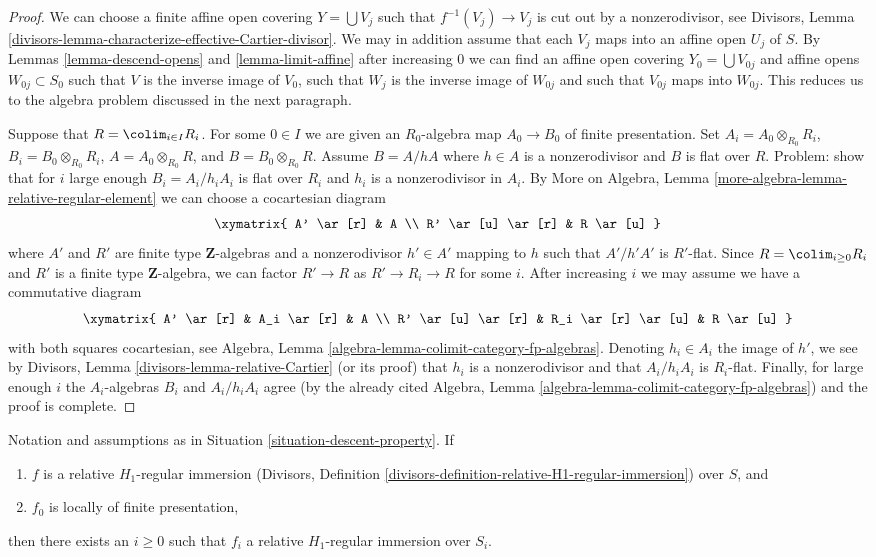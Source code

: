 \begin{proof}
We can choose a finite affine open covering $Y = \bigcup V_j$
such that $f^{-1}(V_j) \to V_j$ is cut out by a nonzerodivisor, see
Divisors, Lemma \ref{divisors-lemma-characterize-effective-Cartier-divisor}.
We may in addition assume that each $V_j$ maps into an affine open
$U_j$ of $S$.
By Lemmas \ref{lemma-descend-opens} and \ref{lemma-limit-affine}
after increasing $0$ we can find an affine open covering
$Y_0 = \bigcup V_{0j}$ and affine opens $W_{0j} \subset S_0$
such that $V$ is the inverse image of $V_0$, such that $W_j$ is the
inverse image of $W_{0j}$ and such that $V_{0j}$ maps into $W_{0j}$.
This reduces us to the algebra problem discussed in the next
paragraph.

\medskip\noindent
Suppose that $R = \colim_{i \in I} R_i$. For some $0 \in I$ we are given
an $R_0$-algebra map $A_0 \to B_0$ of finite presentation. Set
$A_i = A_0 \otimes_{R_0} R_i$, $B_i = B_0 \otimes_{R_0} R_i$,
$A = A_0 \otimes_{R_0} R$, and $B = B_0 \otimes_{R_0} R$.
Assume $B = A/hA$ where $h \in A$ is a nonzerodivisor and
$B$ is flat over $R$. Problem: show that for $i$ large enough
$B_i = A_i/h_iA_i$ is flat over $R_i$ and $h_i$ is a nonzerodivisor in $A_i$.
By More on Algebra, Lemma
\ref{more-algebra-lemma-relative-regular-element}
we can choose a cocartesian diagram
$$
\xymatrix{
A' \ar[r] & A \\
R' \ar[u] \ar[r] & R \ar[u]
}
$$
where $A'$ and $R'$ are finite type $\mathbf{Z}$-algebras
and a nonzerodivisor $h' \in A'$ mapping to $h$ such that
$A'/h'A'$ is $R'$-flat. Since $R = \colim_{i \geq 0} R_i$
and $R'$ is a finite type $\mathbf{Z}$-algebra, we can factor
$R' \to R$ as $R' \to R_i \to R$ for some $i$.
After increasing $i$ we may assume we have a commutative diagram
$$
\xymatrix{
A' \ar[r] & A_i \ar[r] & A \\
R' \ar[u] \ar[r] & R_i \ar[r] \ar[u] & R \ar[u]
}
$$
with both squares cocartesian, see
Algebra, Lemma \ref{algebra-lemma-colimit-category-fp-algebras}.
Denoting $h_i \in A_i$ the image of $h'$, we see by
Divisors, Lemma \ref{divisors-lemma-relative-Cartier} (or its proof)
that $h_i$ is a nonzerodivisor
and that $A_i/h_iA_i$ is $R_i$-flat. Finally, for large enough
$i$ the $A_i$-algebras $B_i$ and $A_i/h_iA_i$ agree
(by the already cited
Algebra, Lemma \ref{algebra-lemma-colimit-category-fp-algebras})
and the
proof is complete.
\end{proof}

\begin{lemma}
\label{lemma-descend-relative-H1-regular}
Notation and assumptions as in Situation \ref{situation-descent-property}.
If
\begin{enumerate}
\item $f$ is a relative $H_1$-regular immersion
(Divisors, Definition
\ref{divisors-definition-relative-H1-regular-immersion})
over $S$, and
\item $f_0$ is locally of finite presentation,
\end{enumerate}
then there exists an $i \geq 0$ such that $f_i$
a relative $H_1$-regular immersion over $S_i$.
\end{lemma}

